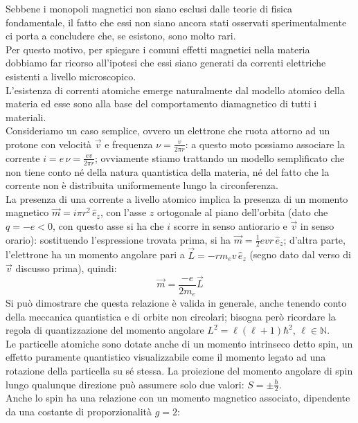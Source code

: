 Sebbene i monopoli magnetici non siano esclusi dalle teorie di fisica fondamentale, il fatto che essi non siano ancora stati osservati sperimentalmente ci porta a concludere che, se esistono, sono molto rari. \\ 
Per questo motivo, per spiegare i comuni effetti magnetici nella materia dobbiamo far ricorso all'ipotesi che essi siano generati da correnti elettriche esistenti a livello microscopico. \\ 
%
L'esistenza di correnti atomiche emerge naturalmente dal modello atomico della materia ed esse sono alla base del comportamento diamagnetico di tutti i materiali. \\ 
%
Consideriamo un caso semplice, ovvero un elettrone che ruota attorno ad un protone con velocità $ \vec{v} $ e frequenza $ \nu = \frac{v}{2\pi r} $: a questo moto possiamo associare la corrente $ i = e\,\nu = \frac{ev}{2\pi r} $; ovviamente stiamo trattando un modello semplificato che non tiene conto né della natura quantistica della materia, né del fatto che la corrente non è distribuita uniformemente lungo la circonferenza. \\ 
La presenza di una corrente a livello atomico implica la presenza di un momento magnetico $ \vec{m} = i \pi r^2 \,\hat{e}_z $, con l'asse $ z $ ortogonale al piano dell'orbita (dato che $ q = -e < 0 $, con questo asse si ha che $ i $ scorre in senso antiorario e $ \vec{v} $ in senso orario): sostituendo l'espressione trovata prima, si ha $ \vec{m} = \frac{1}{2} evr \,\hat{e}_z $; d'altra parte, l'elettrone ha un momento angolare pari a $ \vec{L} = - r m_e v \,\hat{e}_z  $ (segno dato dal verso di $ \vec{v} $ discusso prima), quindi:
\begin{equation}
	\vec{m} = \frac{-e}{2m_e}\vec{L}
	\label{eq:1}
\end{equation}
Si può dimostrare che questa relazione è valida in generale, anche tenendo conto della meccanica quantistica e di orbite non circolari; bisogna però ricordare la regola di quantizzazione del momento angolare $ L^2 = \ell(\ell+1)\hbar^2 $, $ \ell \in \mathbb{N} $. \\ 
%
Le particelle atomiche sono dotate anche di un momento intrinseco detto spin, un effetto puramente quantistico visualizzabile come il momento legato ad una rotazione della particella su sé stessa. La proiezione del momento angolare di spin lungo qualunque direzione può assumere solo due valori: $ S = \pm \frac{\hbar}{2} $. \\ 
Anche lo spin ha una relazione con un momento magnetico associato, dipendente da una costante di proporzionalità $ g = 2 $:
